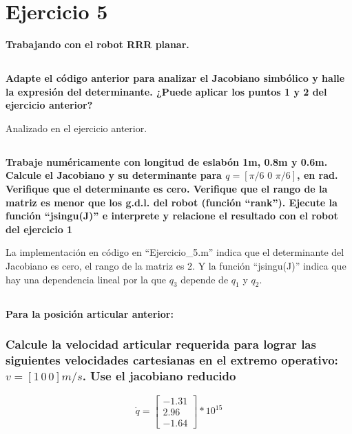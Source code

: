 \documentclass[a4paper,12pt]{article}
\begin{document}
\section{Ejercicio 5}
\textbf{Trabajando con el robot RRR planar.}

\subsection{}
\textbf{Adapte el código anterior para analizar el Jacobiano simbólico y halle la expresión del
determinante. ¿Puede aplicar los puntos 1 y 2 del ejercicio anterior?}

Analizado en el ejercicio anterior.
\subsection{}
\textbf{Trabaje numéricamente con longitud de eslabón 1m, 0.8m y 0.6m. Calcule el Jacobiano
y su determinante para $ q = \left[\pi/6\,\,0\,\,\pi/6\right]$, en rad. Verifique que el determinante
es cero. Verifique que el rango de la matriz es menor que los g.d.l. del robot (función
“rank”). Ejecute la función “jsingu(J)” e interprete y relacione el resultado con el robot
del ejercicio 1}

La implementación en código en ``Ejercicio\_5.m'' indica que el determinante del Jacobiano es cero,
el rango de la matriz es 2. Y la función ``jsingu(J)'' indica que hay una dependencia lineal por la que
$q_3$ depende de $q_1$ y $q_2$.

\subsection{}
\textbf{Para la posición articular anterior:}
\subsubsection{Calcule la velocidad articular requerida para lograr las siguientes velocidades
cartesianas en el extremo operativo: $v = \left[1\,0\,0\right] m/s$. Use el jacobiano
reducido}

\begin{equation*}
    \dot{q} =
    \begin{bmatrix}
        -1.31\\
        2.96\\
        -1.64
    \end{bmatrix}*10^{15}
\end{equation*}
\end{document}
